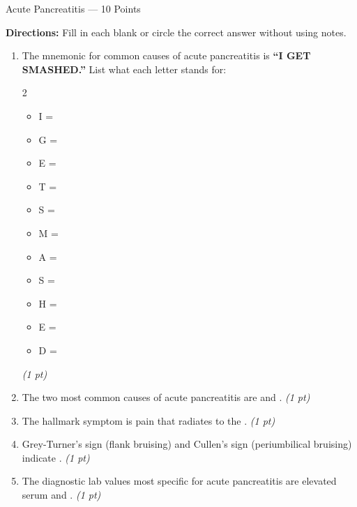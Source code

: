 \documentclass[11pt,letterpaper]{article}
\newcommand{\blank}[1][3cm]{\underline{\hspace{#1}}}
\begin{document}
\begin{diagbox}{Acute Pancreatitis --- 10 Points}

\textbf{Directions:} Fill in each blank or circle the correct answer without using notes.

\begin{enumerate}[leftmargin=1.5em, label=\textbf{\arabic*.},start=21]

  \item The mnemonic for common causes of acute pancreatitis is
        \textbf{``I GET SMASHED.''}  List what each letter stands for:
        \begin{multicols}{2}
        \begin{itemize}[leftmargin=1em]
          \item I = \blank[3.5cm]
          \item G = \blank[3.5cm]
          \item E = \blank[3.5cm]
          \item T = \blank[3.5cm]
          \item S = \blank[3.5cm]
          \item M = \blank[3.5cm]
          \item A = \blank[3.5cm]
          \item S = \blank[3.5cm]
          \item H = \blank[3.5cm]
          \item E = \blank[3.5cm]
          \item D = \blank[3.5cm]
        \end{itemize}
        \end{multicols}
        \hfill\textit{(1 pt)}

  \item The two most common causes of acute pancreatitis are
        \blank[3.5cm] and \blank[3.5cm].
        \hfill\textit{(1 pt)}

  \item The hallmark symptom is \blank[3cm] pain that radiates to the
        \blank[3cm].
        \hfill\textit{(1 pt)}

  \item Grey-Turner's sign (flank bruising) and Cullen's sign (periumbilical bruising)
        indicate \blank[5cm].
        \hfill\textit{(1 pt)}

  \item The diagnostic lab values most specific for acute pancreatitis are elevated
        serum \blank[2.5cm] and \blank[2.5cm].
        \hfill\textit{(1 pt)}


\end{enumerate}
\end{diagbox}
\end{document}

